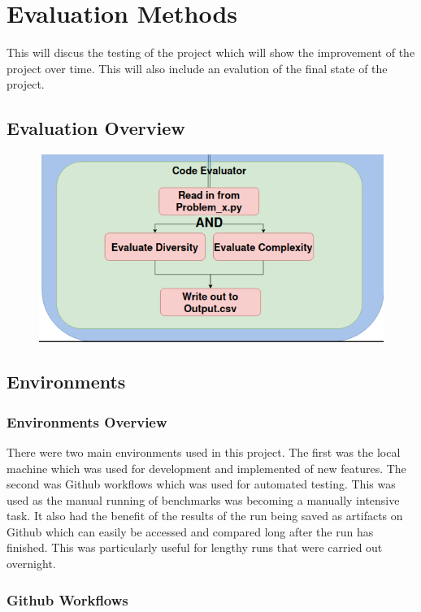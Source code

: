 \documentclass[12pt]{extarticle}
\begin{document}
\newpage
\section{Evaluation Methods}

This will discus the testing of the project which will show the improvement of the project over time. This will also include an evalution of the final state of the project.

\subsection{Evaluation Overview}

\begin{figure}[H]
\centering
\includegraphics[width=0.7\linewidth]{Images/Code_Evaluator.png}
\label{fig:code_evaluator}
\end{figure}

\subsection{Environments}

\subsubsection{Environments Overview}

There were two main environments used in this project. The first was the local machine which was used for development and implemented of new features. The second was Github workflows which was used for automated testing. This was used as the manual running of benchmarks was becoming a manually intensive task. It also had the benefit of the results of the run being saved as artifacts on Github which can easily be accessed and compared long after the run has finished. This was particularly useful for lengthy runs that were carried out overnight.

\subsubsection{Github Workflows}
\end{document}
